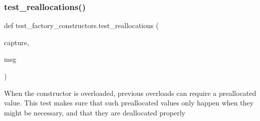 \subsubsection{\texorpdfstring{test\_reallocations()}{test\_reallocations()}}
{\footnotesize\ttfamily def test\+\_\+factory\+\_\+constructors.\+test\+\_\+reallocations (\begin{DoxyParamCaption}\item[{}]{capture,  }\item[{}]{msg }\end{DoxyParamCaption})}

\begin{DoxyVerb}When the constructor is overloaded, previous overloads can require a preallocated value.
This test makes sure that such preallocated values only happen when they might be necessary,
and that they are deallocated properly\end{DoxyVerb}
 